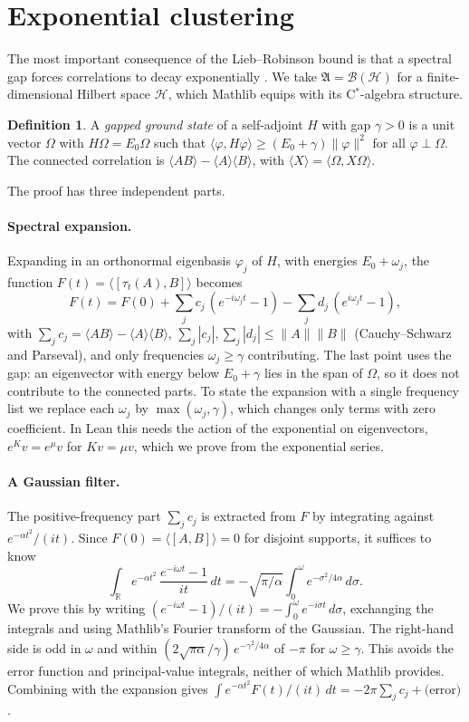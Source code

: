 \documentclass[11pt]{article}
\theoremstyle{definition}
\newtheorem{definition}[theorem]{Definition}
\theoremstyle{remark}
\newcommand{\fA}{\mathfrak{A}}
\newcommand{\norm}[1]{\|#1\|}
\begin{document}
\section{Exponential clustering}\label{sec:clustering}

The most important consequence of the Lieb--Robinson bound is that a spectral gap forces
correlations to decay exponentially \cite{nachtergaelesims2006,hastingskoma2006}. We take
$\fA=\mathcal B(\mathcal H)$ for a finite-dimensional Hilbert space $\mathcal H$, which Mathlib
equips with its C$^*$-algebra structure.

\begin{definition}
A \emph{gapped ground state} of a self-adjoint $H$ with gap $\gamma>0$ is a unit vector $\Omega$
with $H\Omega=E_0\Omega$ such that $\langle\varphi,H\varphi\rangle\ge(E_0+\gamma)\norm{\varphi}^2$
for all $\varphi\perp\Omega$. The connected correlation is
$\langle AB\rangle-\langle A\rangle\langle B\rangle$, with
$\langle X\rangle=\langle\Omega,X\Omega\rangle$.
\end{definition}

The proof has three independent parts.

\paragraph{Spectral expansion.} Expanding in an orthonormal eigenbasis $\varphi_j$ of $H$, with
energies $E_0+\omega_j$, the function $F(t)=\langle[\tau_t(A),B]\rangle$ becomes
\[
  F(t)=F(0)+\sum_j c_j\,(e^{-i\omega_jt}-1)-\sum_j d_j\,(e^{i\omega_jt}-1),
\]
with $\sum_jc_j=\langle AB\rangle-\langle A\rangle\langle B\rangle$, $\sum_j|c_j|,\sum_j|d_j|\le
\norm A\norm B$ (Cauchy--Schwarz and Parseval), and only frequencies $\omega_j\ge\gamma$
contributing. The last point uses the gap: an eigenvector with energy below $E_0+\gamma$ lies in
the span of $\Omega$, so it does not contribute to the connected parts. To state the expansion
with a single frequency list we replace each $\omega_j$ by $\max(\omega_j,\gamma)$, which changes
only terms with zero coefficient. In Lean this needs the action of the exponential on
eigenvectors, $e^{K}v=e^{\mu}v$ for $Kv=\mu v$, which we prove from the exponential series.

\paragraph{A Gaussian filter.} The positive-frequency part $\sum_jc_j$ is extracted from $F$ by
integrating against $e^{-\alpha t^2}/(it)$. Since $F(0)=\langle[A,B]\rangle=0$ for disjoint
supports, it suffices to know
\[
  \int_{\mathbb R}e^{-\alpha t^2}\,\frac{e^{-i\omega t}-1}{it}\,dt
  =-\sqrt{\pi/\alpha}\int_0^\omega e^{-\sigma^2/4\alpha}\,d\sigma .
\]
We prove this by writing $(e^{-i\omega t}-1)/(it)=-\int_0^\omega e^{-i\sigma t}\,d\sigma$,
exchanging the integrals and using Mathlib's Fourier transform of the Gaussian. The right-hand
side is odd in $\omega$ and within $(2\sqrt{\pi\alpha}/\gamma)\,e^{-\gamma^2/4\alpha}$ of $-\pi$
for $\omega\ge\gamma$. This avoids the error function and principal-value integrals, neither of
which Mathlib provides. Combining with the expansion gives
$\int e^{-\alpha t^2}F(t)/(it)\,dt=-2\pi\sum_jc_j+\text{(error)}$.
\end{document}
